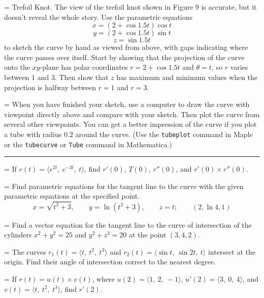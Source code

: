 \documentclass[a4paper,12pt,twocolumn]{article}
\newlength{\problemnumberwidth}
\newcommand{\problemtitle}[2]{%
  \hypertarget{#1}{}%
  \par\vspace{0.4em}%
  \noindent{\large\bfseries #2}\par
  \vspace{0.3em}%
  \hrule
  \vspace{0.9em}%
}
\newcommand{\problem}[2]{%
  \par\noindent
  \hangindent=\problemnumberwidth
  \hangafter=1
  \makebox[\problemnumberwidth][l]{\textbf{#1.}}#2\par
  \vspace{1.4em}%
}
\begin{document}
\problem{60}{Trefoil Knot. The view of the trefoil knot shown in Figure 9 is accurate, but it doesn't reveal the whole story. Use the parametric equations
\[
x=(2+\cos 1.5t)\cos t
\]
\[
y=(2+\cos 1.5t)\sin t
\]
\[
z=\sin 1.5t
\]
to sketch the curve by hand as viewed from above, with gaps indicating where the curve passes over itself. Start by showing that the projection of the curve onto the \(xy\)-plane has polar coordinates \(r=2+\cos 1.5t\) and \(\theta=t\), so \(r\) varies between \(1\) and \(3\). Then show that \(z\) has maximum and minimum values when the projection is halfway between \(r=1\) and \(r=3\).
{\medskip\par
\hangindent=\problemnumberwidth
\hangafter=1
\noindent\hspace*{\problemnumberwidth}When you have finished your sketch, use a computer to draw the curve with viewpoint directly above and compare with your sketch. Then plot the curve from several other viewpoints. You can get a better impression of the curve if you plot a tube with radius \(0.2\) around the curve. (Use the \texttt{tubeplot} command in Maple or the \texttt{tubecurve} or \texttt{Tube} command in Mathematica.)}}

\problemtitle{sec:13-2}{13-2}

\problem{24}{If \(r(t)=\langle e^{2t},\ e^{-3t},\ t\rangle\), find \(r'(0)\), \(T(0)\), \(r''(0)\), and \(r'(0)\times r''(0)\).}

\problem{28}{Find parametric equations for the tangent line to the curve with the given parametric equations at the specified point.
\[
x=\sqrt{t^2+3}, \qquad y=\ln(t^2+3), \qquad z=t; \qquad (2,\ln 4,1)
\]}

\problem{29}{Find a vector equation for the tangent line to the curve of intersection of the cylinders \(x^2+y^2=25\) and \(y^2+z^2=20\) at the point \((3,4,2)\).}

\problem{35}{The curves \(r_1(t)=\langle t,\ t^2,\ t^3\rangle\) and \(r_2(t)=\langle \sin t,\ \sin 2t,\ t\rangle\) intersect at the origin. Find their angle of intersection correct to the nearest degree.}

\problem{52}{If \(r(t)=u(t)\times v(t)\), where \(u(2)=\langle 1,\ 2,\ -1\rangle\), \(u'(2)=\langle 3,\ 0,\ 4\rangle\), and \(v(t)=\langle t,\ t^2,\ t^3\rangle\), find \(r'(2)\).}
\end{document}

